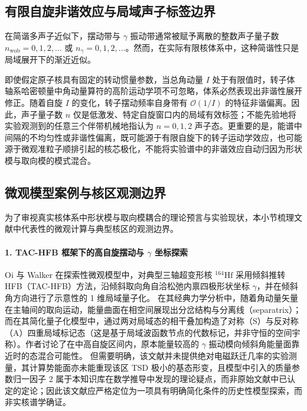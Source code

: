 \subsection{有限自旋非谐效应与局域声子标签边界}\label{sec:3-6-5}

在简谐多声子近似下，摆动带与 $\gamma$ 振动带通常被赋予离散的整数声子量子数 $n_{\mathrm{wob}} = 0, 1, 2, \dots$ 或 $n_\gamma = 0, 1, 2, \dots$。然而，在实际有限核体系中，这种简谐性只是局域展开下的渐近近似。

即使假定原子核具有固定的转动惯量参数，当总角动量 $I$ 处于有限值时，转子体轴系哈密顿量中角动量算符的高阶运动学项不可忽略，体系必然表现出非谐性展开修正。随着自旋 $I$ 的变化，转子摆动频率自身带有 $\mathcal{O}(1/I)$ 的特征非谐偏离。因此，声子量子数 $n$ 仅是低激发、特定自旋窗口内的局域有效标签；不能先验地将实验观测到的任意三个伴带机械地指认为 $n=0, 1, 2$ 声子态。更重要的是，能谱中间隔的不均匀性或非谐性偏离，既可能源于有限自旋下的转子运动学效应，也可能源于微观准粒子顺排引起的核芯极化，不能将实验谱中的非谐效应自动归因为形状模与取向模的模式混合。

\subsection{微观模型案例与核区观测边界}\label{sec:3-6-6}

为了审视真实核体系中形状模与取向模耦合的理论预言与实验现状，本小节梳理文献中代表性的微观计算与典型核区的观测边界。

\paragraph{1. TAC-HFB 框架下的高自旋摆动与 $\gamma$ 坐标探索}
Oi 与 Walker 在探索性微观模型中，对典型三轴超变形核 $^{164}\mathrm{Hf}$ 采用倾斜推转 HFB（TAC-HFB）方法，沿倾斜取向角自洽松弛内禀四极形状坐标 $\gamma$，并在倾斜角方向进行了示意性的 1 维局域量子化。\cite{doctoral-r1-g37-oi-2001-wobbling-gamma-coupling} 在其经典力学分析中，随着角动量矢量在主轴间的取向运动，能量曲面在相空间展现出分岔结构与分离线（separatrix）；而在其简化量子化模型中，通过两对局域态的相干叠加构造了对称（S）与反对称（A）四重局域标记态（这是基于局域波函数节点的代数标记，并非守恒的空间宇称）。作者讨论了在中高自旋区间内，原本能量较高的 $\gamma$ 振动模向倾斜角能量面靠近时的态混合可能性。\cite{doctoral-r1-g37-oi-2001-wobbling-gamma-coupling} 但需要明确，该文献并未提供绝对电磁跃迁几率的实验测量，其计算势能面亦未能重现该区 TSD 极小的基态形变，且模型中引入的质量参数归一因子 2 属于本知识库在数学推导中发现的理论疑点，而非原始文献中已认定的定论；因此该文献应严格定位为一项具有明确简化条件的历史性模型探索，而非实核谱学确证。

